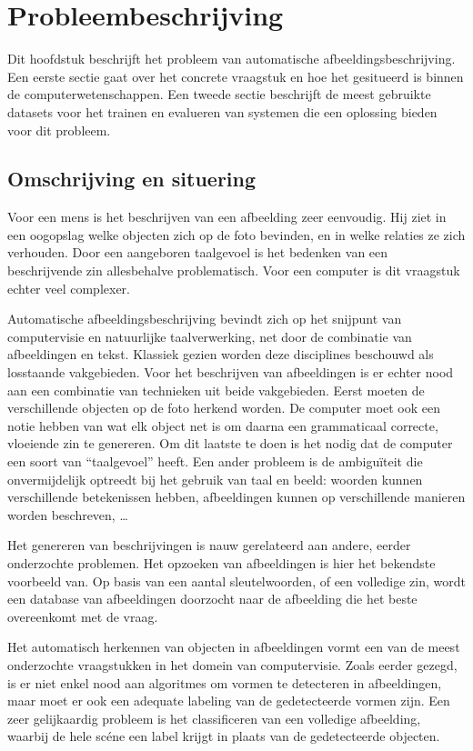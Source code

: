 \chapter{Probleembeschrijving}
\label{chap:Probleembeschrijving}

Dit hoofdstuk beschrijft het probleem van automatische afbeeldingsbeschrijving. Een eerste sectie gaat over het concrete vraagstuk en hoe het gesitueerd is binnen de computerwetenschappen. Een tweede sectie beschrijft de meest gebruikte datasets voor het trainen en evalueren van systemen die een oplossing bieden voor dit probleem.

\section{Omschrijving en situering}
\label{sec:Omschrijving en situering}
Voor een mens is het beschrijven van een afbeelding zeer eenvoudig. Hij ziet in een oogopslag welke objecten zich op de foto bevinden, en in welke relaties ze zich verhouden. Door een aangeboren taalgevoel is het bedenken van een beschrijvende zin allesbehalve problematisch.
Voor een computer is dit vraagstuk echter veel complexer.

Automatische afbeeldingsbeschrijving bevindt zich op het snijpunt van computervisie en natuurlijke taalverwerking, net door de combinatie van afbeeldingen en tekst. Klassiek gezien worden deze disciplines beschouwd als losstaande vakgebieden. Voor het beschrijven van afbeeldingen is er echter nood aan een combinatie van technieken uit beide vakgebieden. Eerst moeten de verschillende objecten op de foto herkend worden. De computer moet ook een notie hebben van wat elk object net is om daarna een grammaticaal correcte, vloeiende zin te genereren. Om dit laatste te doen is het nodig dat de computer een soort van ``taalgevoel'' heeft. Een ander probleem is de ambigu\"iteit die onvermijdelijk optreedt bij het gebruik van taal en beeld: woorden kunnen verschillende betekenissen hebben, afbeeldingen kunnen op verschillende manieren worden beschreven, \ldots

Het genereren van beschrijvingen is nauw gerelateerd aan andere, eerder onderzochte problemen. Het opzoeken van afbeeldingen is hier het bekendste voorbeeld van. Op basis van een aantal sleutelwoorden, of een volledige zin, wordt een database van afbeeldingen doorzocht naar de afbeelding die het beste overeenkomt met de vraag.

Het automatisch herkennen van objecten in afbeeldingen vormt een van de meest onderzochte vraagstukken in het domein van computervisie. Zoals eerder gezegd, is er niet enkel nood aan algoritmes om vormen te detecteren in afbeeldingen, maar moet er ook een adequate labeling van de gedetecteerde vormen zijn. Een zeer gelijkaardig probleem is het classificeren van een volledige afbeelding, waarbij de hele sc\'ene een label krijgt in plaats van de gedetecteerde objecten. 

